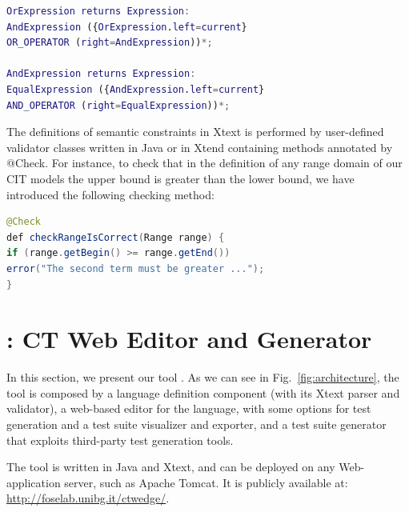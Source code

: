 \begin{tikzborder}{\cite{Gargantini16:validation}}
\begin{tikzborder}{\cite{gargantini_combinatorial_2017}}
\begin{tikzborder}{\cite{gargantini_combinatorial_2017}}
\begin{tikzborder}{\cite{garn2019}}
\begin{tikzborder}{\cite{arcaini2019achieving}}
\begin{lstlisting}[language=Matlab,columns=fullflexible,basicstyle=\small\ttfamily,stringstyle=\ttfamily\color{blue},upquote=true,morekeywords={returns}]  
OrExpression returns Expression:
AndExpression ({OrExpression.left=current} 
OR_OPERATOR (right=AndExpression))*;

AndExpression returns Expression:
EqualExpression ({AndExpression.left=current}
AND_OPERATOR (right=EqualExpression))*;
\end{lstlisting}


\begin{tikzborder}{}
The definitions of semantic constraints in Xtext is performed by user-defined validator classes written in Java or in Xtend containing methods annotated by {\small\ttfamily @Check}. For instance, to check that in the definition of any range domain of our CIT models  the upper bound is greater than the lower bound, we have introduced the following checking method:
\end{tikzborder}

\begin{lstlisting}[language=Java,morekeywords={def},basicstyle=\small\ttfamily]
@Check
def checkRangeIsCorrect(Range range) {
if (range.getBegin() >= range.getEnd())
error("The second term must be greater ...");
}
\end{lstlisting}

\section{\ctwedge: CT Web Editor and Generator}\label{sec:ctwedge}

\begin{tikzborder}{}
In this section, we present our tool \ctwedge. 
As we can see in Fig.~\ref{fig:architecture}, the tool is composed by a language definition component (with its Xtext parser and validator), a web-based editor for the \ctwedge language, with some options for test generation and a test suite visualizer and exporter, and a test suite generator that exploits third-party test generation tools.

The tool is written in Java and Xtext, and can be deployed on any Web-application server, such as Apache Tomcat. It is publicly available at: \url{http://foselab.unibg.it/ctwedge/}.
\end{tikzborder}


\end{tikzborder}
\end{tikzborder}
\end{tikzborder}
\end{tikzborder}
\end{tikzborder}
